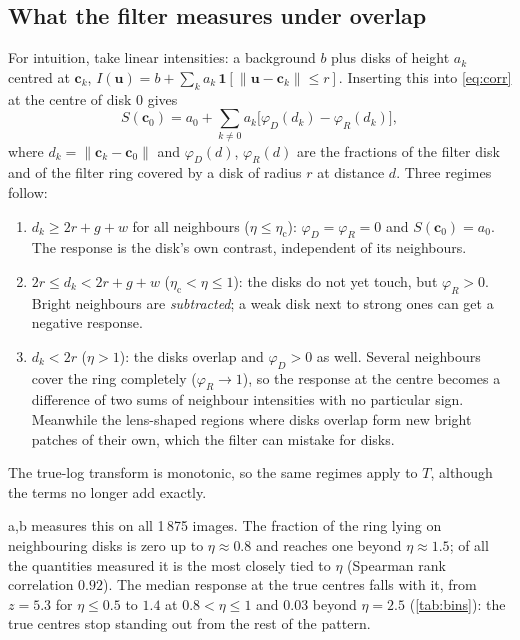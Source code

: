 \documentclass[11pt,a4paper]{article}
\newcommand{\vect}[1]{\bm{#1}}
\newcommand{\ind}{\mathbf{1}}
\newcommand{\etac}{\eta_{\mathrm{c}}}
\begin{document}
\subsection{What the filter measures under overlap}
For intuition, take linear intensities: a background $b$ plus disks of height $a_k$ centred at $\vect c_k$,
$I(\vect u) = b + \sum_k a_k\, \ind[\|\vect u - \vect c_k\| \le r]$. Inserting this into \cref{eq:corr} at the centre of
disk $0$ gives
\begin{equation}
  S(\vect c_0) = a_0 + \sum_{k \ne 0} a_k \bigl[\varphi_D(d_k) - \varphi_R(d_k)\bigr],
  \label{eq:response}
\end{equation}
where $d_k = \|\vect c_k - \vect c_0\|$ and $\varphi_D(d)$, $\varphi_R(d)$ are the fractions of the filter disk and of
the filter ring covered by a disk of radius $r$ at distance $d$. Three regimes follow:
\begin{enumerate}
  \item $d_k \ge 2r + g + w$ for all neighbours ($\eta \le \etac$): $\varphi_D = \varphi_R = 0$ and $S(\vect c_0) = a_0$.
        The response is the disk's own contrast, independent of its neighbours.
  \item $2r \le d_k < 2r + g + w$ ($\etac < \eta \le 1$): the disks do not yet touch, but $\varphi_R > 0$. Bright
        neighbours are \emph{subtracted}; a weak disk next to strong ones can get a negative response.
  \item $d_k < 2r$ ($\eta > 1$): the disks overlap and $\varphi_D > 0$ as well. Several neighbours cover the ring
        completely ($\varphi_R \to 1$), so the response at the centre becomes a difference of two sums of neighbour
        intensities with no particular sign. Meanwhile the lens-shaped regions where disks overlap form new bright
        patches of their own, which the filter can mistake for disks.
\end{enumerate}
The true-log transform is monotonic, so the same regimes apply to $T$, although the terms no longer add exactly.

a,b measures this on all 1\,875 images. The fraction of the ring lying on neighbouring disks is
zero up to $\eta \approx 0.8$ and reaches one beyond $\eta \approx 1.5$; of all the quantities measured it is the most
closely tied to $\eta$ (Spearman rank correlation $0.92$). The median response at the true centres falls with it, from
$z = 5.3$ for $\eta \le 0.5$ to $1.4$ at $0.8 < \eta \le 1$ and $0.03$ beyond $\eta = 2.5$ (\cref{tab:bins}): the true
centres stop standing out from the rest of the pattern.
\end{document}
